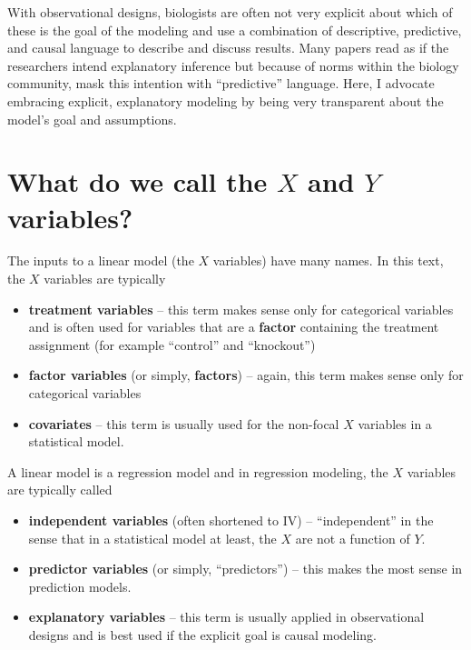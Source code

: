 \documentclass[]{book}
\providecommand{\tightlist}{%
  \setlength{\itemsep}{0pt}\setlength{\parskip}{0pt}}
\begin{document}
With observational designs, biologists are often not very explicit about which of these is the goal of the modeling and use a combination of descriptive, predictive, and causal language to describe and discuss results. Many papers read as if the researchers intend explanatory inference but because of norms within the biology community, mask this intention with ``predictive'' language. Here, I advocate embracing explicit, explanatory modeling by being very transparent about the model's goal and assumptions.

\hypertarget{what-do-we-call-the-x-and-y-variables}{%
\section{\texorpdfstring{What do we call the \(X\) and \(Y\) variables?}{What do we call the X and Y variables?}}\label{what-do-we-call-the-x-and-y-variables}}

The inputs to a linear model (the \(X\) variables) have many names. In this text, the \(X\) variables are typically

\begin{itemize}
\tightlist
\item
  \textbf{treatment variables} -- this term makes sense only for categorical variables and is often used for variables that are a \textbf{factor} containing the treatment assignment (for example ``control'' and ``knockout'')
\item
  \textbf{factor variables} (or simply, \textbf{factors}) -- again, this term makes sense only for categorical variables
\item
  \textbf{covariates} -- this term is usually used for the non-focal \(X\) variables in a statistical model.
\end{itemize}

A linear model is a regression model and in regression modeling, the \(X\) variables are typically called

\begin{itemize}
\tightlist
\item
  \textbf{independent variables} (often shortened to IV) -- ``independent'' in the sense that in a statistical model at least, the \(X\) are not a function of \(Y\).
\item
  \textbf{predictor variables} (or simply, ``predictors'') -- this makes the most sense in prediction models.
\item
  \textbf{explanatory variables} -- this term is usually applied in observational designs and is best used if the explicit goal is causal modeling.
\end{itemize}
\end{document}
